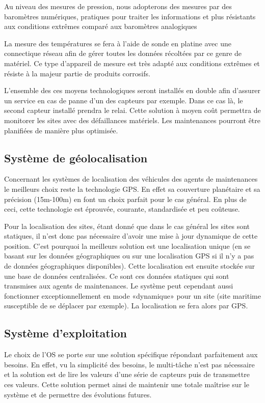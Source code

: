 \documentclass{mise_en_page}
\begin{document}
Au niveau des mesures de pression, nous adopterons des mesures par des
baromètres numériques, pratiques pour traiter les informations et plus
résistants aux conditions extrêmes comparé aux baromètres analogiques

La mesure des températures se fera à l’aide de sonde en platine avec une
connectique réseau afin de gérer toutes les données récoltées par ce
genre de matériel. Ce type d’appareil de mesure est très adapté aux
conditions extrêmes et résiste à la majeur partie de produits
corrosifs.

L’ensemble des ces moyens technologiques seront installés en double afin
d’assurer un service en cas de panne d’un des capteurs par exemple.
Dans ce cas là, le second capteur installé prendra le relai. Cette
solution à moyen coût permettra de monitorer les sites avec des
défaillances matériels. Les maintenances pourront être planifiées de
manière plus optimisée.

\subsection{Système de géolocalisation}
Concernant les systèmes de localisation des véhicules des agents de
maintenances le meilleurs choix reste la technologie GPS. En effet sa
couverture planétaire et sa précision (15m-100m) en font un choix
parfait pour le cas général. En plus de ceci, cette technologie est
éprouvée, courante, standardisée et peu coûteuse.

Pour la localisation des sites, étant donné que dans le cas général les
sites sont statiques, il n’est donc pas nécessaire d’avoir une mise à
jour dynamique de cette position. C’est pourquoi la meilleurs solution
est une localisation unique (en se basant sur les données géographiques
ou sur une localisation GPS si il n’y a pas de données géographiques
disponibles). Cette localisation est ensuite stockée sur une base de
données centralisées. Ce sont ces données statiques qui sont transmises
aux agents de maintenances. Le système peut cependant aussi fonctionner
exceptionnellement en mode «dynamique» pour un site (site maritime
susceptible de se déplacer par exemple). La localisation se fera alors
par GPS.

\subsection{Système d’exploitation}
Le choix de l’OS se porte sur une solution spécifique répondant
parfaitement aux besoins. En effet, vu la simplicité des besoins, le
multi-tâche n’est pas nécessaire et la solution est de lire les valeurs
d’une série de capteurs puis de transmettre ces valeurs. Cette solution
permet ainsi de maintenir une totale maîtrise sur le système et de
permettre des évolutions futures.
\end{document}
